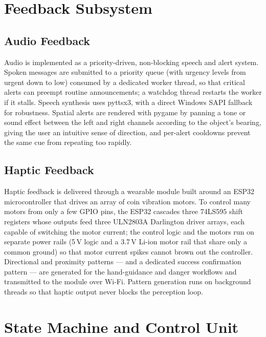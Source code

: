\section{Feedback Subsystem}

\subsection{Audio Feedback}

Audio is implemented as a priority-driven, non-blocking speech and alert system. Spoken messages are submitted to a priority queue (with urgency levels from urgent down to low) consumed by a dedicated worker thread, so that critical alerts can preempt routine announcements; a watchdog thread restarts the worker if it stalls. Speech synthesis uses pyttsx3, with a direct Windows SAPI fallback for robustness. Spatial alerts are rendered with pygame by panning a tone or sound effect between the left and right channels according to the object's bearing, giving the user an intuitive sense of direction, and per-alert cooldowns prevent the same cue from repeating too rapidly.

\subsection{Haptic Feedback}

Haptic feedback is delivered through a wearable module built around an ESP32 microcontroller that drives an array of coin vibration motors. To control many motors from only a few GPIO pins, the ESP32 cascades three 74LS595 shift registers whose outputs feed three ULN2803A Darlington driver arrays, each capable of switching the motor current; the control logic and the motors run on separate power rails (5\,V logic and a 3.7\,V Li-ion motor rail that share only a common ground) so that motor current spikes cannot brown out the controller. Directional and proximity patterns --- and a dedicated success confirmation pattern --- are generated for the hand-guidance and danger workflows and transmitted to the module over Wi-Fi. Pattern generation runs on background threads so that haptic output never blocks the perception loop.

\section{State Machine and Control Unit}

